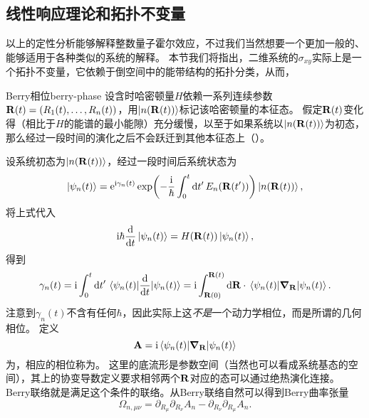 \subsection{线性响应理论和拓扑不变量}

以上的定性分析能够解释整数量子霍尔效应，不过我们当然想要一个更加一般的、能够适用于各种类似的系统的解释。
本节我们将指出，二维系统的$\sigma_{xy}$实际上是一个拓扑不变量，它依赖于倒空间中的能带结构的拓扑分类，从而，

\begin{back}{Berry相位}{berry-phase}
    设含时哈密顿量$H$依赖一系列连续参数$\vb{R}(t) = (R_1(t), \ldots, R_n(t))$，用$\ket{n(\vb{R}(t))}$标记该哈密顿量的本征态。
    假定$\vb{R}(t)$变化得（相比于$H$的能谱的最小能隙）充分缓慢，以至于如果系统以$\ket{n(\vb{R}(t))}$为初态，那么经过一段时间的演化之后不会跃迁到其他本征态上（）。
    
    设系统初态为$\ket{n(\vb{R}(t))}$，经过一段时间后系统状态为
    \begin{equation}
        \ket{\psi_n(t)} = \mathrm{e}^{\mathrm{i} \gamma_n(t)} \exp(-\frac{\mathrm{i}}{\hbar} \int_0^t \dd{t'} E_n(\vb{R}(t'))) \ket{n(\vb{R}(t))},
    \end{equation}
    将上式代入
    \[
        \mathrm{i} \hbar \dv{t} \ket{\psi_n(t)} = H(\vb{R}(t)) \ket{\psi_n(t)},
    \]
    得到
    \begin{equation}
        \gamma_n(t) = \mathrm{i} \int_0^t \dd{t'} \mel*{\psi_n(t)}{\dv{t}}{\psi_n(t)} = \mathrm{i} \int_{\vb{R}(0)}^{\vb{R}(t)} \dd{\vb{R}} \cdot \mel*{\psi_n(t)}{\grad_{\vb{R}}}{\psi_n(t)} .
    \end{equation}
    注意到$\gamma_n(t)$不含有任何$\hbar$，因此实际上这\emph{不是}一个动力学相位，而是所谓的几何相位。
    定义
    \begin{equation}
        \vb{A} = \mathrm{i} \mel*{\psi_n(t)}{\grad_{\vb{R}}}{\psi_n(t)} 
    \end{equation}
    为，相应的相位称为。
    这里的底流形是参数空间（当然也可以看成系统基态的空间），其上的协变导数定义要求相邻两个$\vb{R}$对应的态可以通过绝热演化连接。%
    Berry联络就是满足这个条件的联络。从Berry联络自然可以得到Berry曲率张量
    \begin{equation}
        \Omega_{n, \mu \nu} = \partial_{R_\mu} \partial_{R_\nu} A_n - \partial_{R_\nu} \partial_{R_\mu} A_n.
    \end{equation}
    

\end{back}
